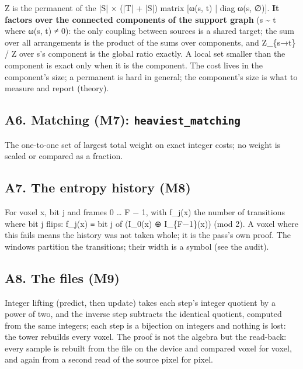 Z is the permanent of the |S| × (|T| + |S|) matrix [ω(s, t) | diag ω(s, ∅)]. \textbf{It factors over the connected components of the support graph} (s \textasciitilde{} t where ω(s, t) ≠ 0): the only coupling between sources is a shared target; the sum over all arrangements is the product of the sums over components, and Z\_\allowbreak{}\{s→t\} / Z over s's component is the global ratio exactly. A local set smaller than the component is exact only when it is the component. The cost lives in the component's size; a permanent is hard in general; the component's size is what to measure and report (theory).

\subsection{\texorpdfstring{A6. Matching (M7): \texttt{heaviest\_\allowbreak{}matching}}{A6. Matching (M7): heaviest\_matching}}

The one-to-one set of largest total weight on exact integer costs; no weight is scaled or compared as a fraction.

\subsection{\texorpdfstring{A7. The entropy history (M8)}{A7. The entropy history (M8)}}

For voxel x, bit j and frames 0 … F − 1, with f\_\allowbreak{}j(x) the number of transitions where bit j flips: f\_\allowbreak{}j(x) ≡ bit j of (I\_\allowbreak{}0(x) ⊕ I\_\allowbreak{}\{F−1\}(x)) (mod 2). A voxel where this fails means the history was not taken whole; it is the pass's own proof. The windows partition the transitions; their width is a symbol (see the audit).

\subsection{\texorpdfstring{A8. The files (M9)}{A8. The files (M9)}}

Integer lifting (predict, then update) takes each step's integer quotient by a power of two, and the inverse step subtracts the identical quotient, computed from the same integers; each step is a bijection on integers and nothing is lost: the tower rebuilds every voxel. The proof is not the algebra but the read-back: every sample is rebuilt from the file on the device and compared voxel for voxel, and again from a second read of the source pixel for pixel.

